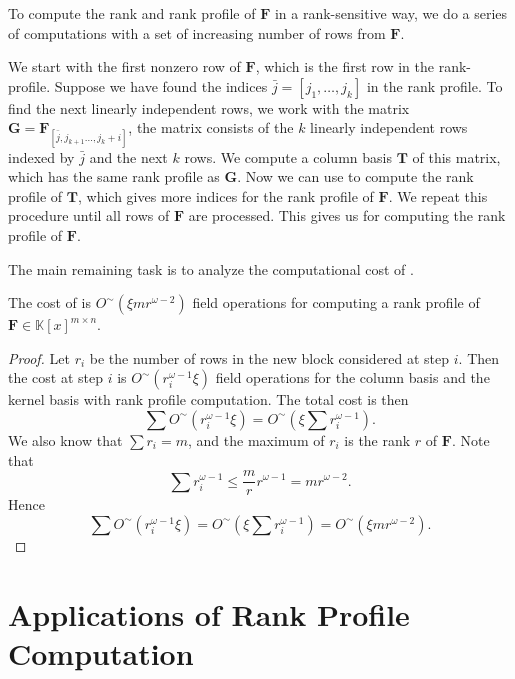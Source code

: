 To compute the rank and rank profile of $\mathbf{F}$ in a rank-sensitive
way, we do a series of computations with a set of increasing number
of rows from $\mathbf{F}$.

We start with the first nonzero row of $\mathbf{F}$, which is the
first row in the rank-profile. Suppose we have found the indices
$\bar{j}=\left[j_{1},\dots,j_{k}\right]$ in the rank profile. To
find the next linearly independent rows, we work with the matrix $\mathbf{G}=\mathbf{F}_{\left[\bar{j},j_{k+1}\dots,j_{k}+i\right]}$,
the matrix consists of the $k$ linearly independent rows indexed
by $\bar{j}$ and the next $k$ rows. We compute a column basis $\mathbf{T}$
of this matrix, which has the same rank profile as $\mathbf{G}$.
Now we can use 
to compute the rank profile of $\mathbf{T}$, which gives more indices
for the rank profile of $\mathbf{F}$. We repeat this procedure until
all rows of $\mathbf{F}$ are processed. This gives us 
for computing the rank profile of $\mathbf{F}$.



The main remaining task is to analyze the computational cost of . 
\begin{thm}
The cost of  is $O^{\sim}\left(\xi mr^{\omega-2}\right)$
field operations for computing a rank profile of $\mathbf{F}\in\mathbb{K}\left[x\right]^{m\times n}$.\end{thm}
\begin{proof}
Let $r_{i}$ be the number of rows in the new block considered at
step $i$. Then the cost at step $i$ is $O^{\sim}\left(r_{i}^{\omega-1}\xi\right)$
field operations for the column basis and the kernel basis with rank
profile computation. The total cost is then 
\[
\sum O^{\sim}\left(r_{i}^{\omega-1}\xi\right)=O^{\sim}\left(\xi\sum r_{i}^{\omega-1}\right).
\]
 We also know that $\sum r_{i}=m$, and the maximum of $r_{i}$ is
the rank $r$ of $\mathbf{F}$. Note that 
\[
\sum r_{i}^{\omega-1}\le\frac{m}{r}r^{\omega-1}=mr^{\omega-2}.
\]
 Hence 
\[
\sum O^{\sim}\left(r_{i}^{\omega-1}\xi\right)=O^{\sim}\left(\xi\sum r_{i}^{\omega-1}\right)=O^{\sim}\left(\xi mr^{\omega-2}\right).
\]

\end{proof}

\section{Applications of Rank Profile Computation}


